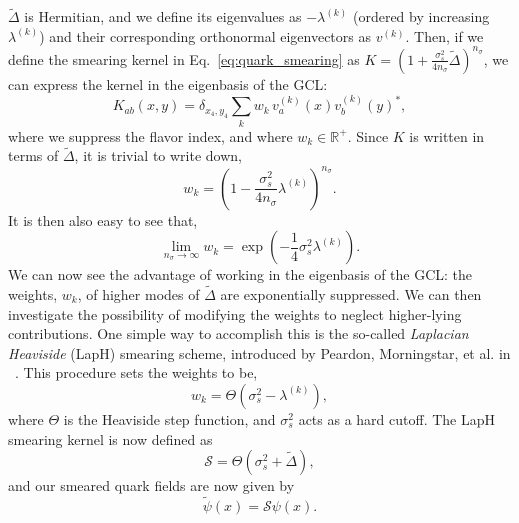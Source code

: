     $\tilde\Delta$ is Hermitian, and we define its eigenvalues as $-\lambda^{(k)}$ (ordered by increasing $\lambda^{(k)}$) and their corresponding orthonormal eigenvectors as $v^{(k)}$. Then, if we define the smearing kernel in Eq.~\ref{eq:quark_smearing} as $K=\left(1+\frac{\sigma_{s}^{2}}{4 n_{\sigma}} \widetilde{\Delta}\right)^{n_{\sigma}}$, we can express the kernel in the eigenbasis of the GCL:
    \begin{equation}
        K_{a b}(x, y)=\delta_{x_{4}, y_{4}} \sum_{k} w_{k}\,v_{a}^{(k)}(x) v_{b}^{(k)}(y)^{*},
    \end{equation}
    where we suppress the flavor index, and where $w_k\in\mathbb{R}^+$. Since $K$ is written in terms of $\tilde\Delta$, it is trivial to write down,
    \begin{equation}
        w_{k}=\left(1-\frac{\sigma_{s}^{2}}{4 n_{\sigma}} \lambda^{(k)}\right)^{n_{\sigma}}.
    \end{equation}
    It is then also easy to see that,
    \begin{equation}
        \lim _{n_{\sigma} \rightarrow \infty} w_{k}=\exp \left(-\frac{1}{4} \sigma_{s}^{2} \lambda^{(k)}\right).
    \end{equation}
    We can now see the advantage of working in the eigenbasis of the GCL: the weights, $w_{k}$, of higher modes of $\tilde\Delta$ are exponentially suppressed. We can then investigate the possibility of modifying the weights to neglect higher-lying contributions. One simple way to accomplish this is the so-called \emph{Laplacian Heaviside} (LapH) smearing scheme, introduced by Peardon, Morningstar, et al. in ~\cite{PhysRevD.80.054506}. This procedure sets the weights to be,
    \begin{equation}
        w_{k}=\Theta\left(\sigma_{s}^{2}-\lambda^{(k)}\right),
    \end{equation}
    where $\Theta$ is the Heaviside step function, and $\sigma_s^2$ acts as a hard cutoff. The LapH smearing kernel is now defined as
    \begin{equation}
        \mathcal{S}=\Theta\left(\sigma_{s}^{2}+\widetilde{\Delta}\right),
    \end{equation}
    and our smeared quark fields are now given by
    \begin{equation}
        \widetilde\psi(x) = \mathcal{S}\psi(x).
    \end{equation}

